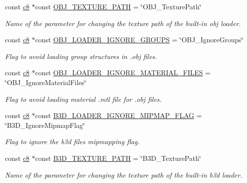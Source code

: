 \begin{DoxyCompactItemize}
const \hyperlink{namespaceirr_a9395eaea339bcb546b319e9c96bf7410}{c8} $\ast$const \hyperlink{namespaceirr_1_1scene_a12d0b16f969fdaaf7c2161a0c7152b54}{O\+B\+J\+\_\+\+T\+E\+X\+T\+U\+R\+E\+\_\+\+P\+A\+TH} = \char`\"{}O\+B\+J\+\_\+\+Texture\+Path\char`\"{}
\begin{DoxyCompactList}\small\item\em Name of the parameter for changing the texture path of the built-\/in obj loader. \end{DoxyCompactList}\item 
const \hyperlink{namespaceirr_a9395eaea339bcb546b319e9c96bf7410}{c8} $\ast$const \hyperlink{namespaceirr_1_1scene_afb0c389302c1e7ad39f83d558dbb2699}{O\+B\+J\+\_\+\+L\+O\+A\+D\+E\+R\+\_\+\+I\+G\+N\+O\+R\+E\+\_\+\+G\+R\+O\+U\+PS} = \char`\"{}O\+B\+J\+\_\+\+Ignore\+Groups\char`\"{}
\begin{DoxyCompactList}\small\item\em Flag to avoid loading group structures in .obj files. \end{DoxyCompactList}\item 
const \hyperlink{namespaceirr_a9395eaea339bcb546b319e9c96bf7410}{c8} $\ast$const \hyperlink{namespaceirr_1_1scene_ac7d5a31e2146062ddbde288115bb6c7b}{O\+B\+J\+\_\+\+L\+O\+A\+D\+E\+R\+\_\+\+I\+G\+N\+O\+R\+E\+\_\+\+M\+A\+T\+E\+R\+I\+A\+L\+\_\+\+F\+I\+L\+ES} = \char`\"{}O\+B\+J\+\_\+\+Ignore\+Material\+Files\char`\"{}
\begin{DoxyCompactList}\small\item\em Flag to avoid loading material .mtl file for .obj files. \end{DoxyCompactList}\item 
const \hyperlink{namespaceirr_a9395eaea339bcb546b319e9c96bf7410}{c8} $\ast$const \hyperlink{namespaceirr_1_1scene_a0a190773ebdbed9f134b17d496fc526a}{B3\+D\+\_\+\+L\+O\+A\+D\+E\+R\+\_\+\+I\+G\+N\+O\+R\+E\+\_\+\+M\+I\+P\+M\+A\+P\+\_\+\+F\+L\+AG} = \char`\"{}B3\+D\+\_\+\+Ignore\+Mipmap\+Flag\char`\"{}
\begin{DoxyCompactList}\small\item\em Flag to ignore the b3d file\textquotesingle{}s mipmapping flag. \end{DoxyCompactList}\item 
const \hyperlink{namespaceirr_a9395eaea339bcb546b319e9c96bf7410}{c8} $\ast$const \hyperlink{namespaceirr_1_1scene_acaad1f28c235751815637948cc845c15}{B3\+D\+\_\+\+T\+E\+X\+T\+U\+R\+E\+\_\+\+P\+A\+TH} = \char`\"{}B3\+D\+\_\+\+Texture\+Path\char`\"{}
\begin{DoxyCompactList}\small\item\em Name of the parameter for changing the texture path of the built-\/in b3d loader. \end{DoxyCompactList}\item 

\end{DoxyCompactItemize}
